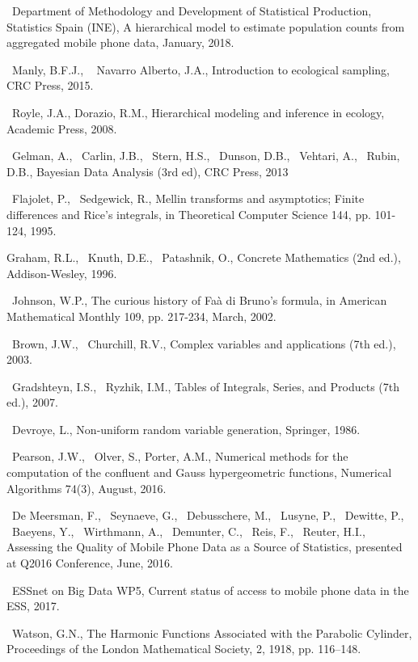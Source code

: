 \documentclass[12pt, a4paper]{article}
\begin{document}
\begin{thebibliography}{99}

~Department of Methodology and Development of Statistical Production, Statistics Spain (INE), 
A hierarchical model to estimate population counts from
aggregated mobile phone data, January, 2018.

~Manly, B.F.J., ~ Navarro Alberto, J.A., Introduction to ecological sampling,
CRC Press, 2015.

~Royle, J.A., Dorazio, R.M., Hierarchical modeling and inference in ecology,
Academic Press, 2008.

~Gelman, A., ~Carlin, J.B., ~Stern, H.S., ~Dunson, D.B., ~Vehtari, A., ~Rubin, D.B., Bayesian Data Analysis (3rd ed), CRC Press, 2013

~Flajolet, P., ~Sedgewick, R.,  Mellin transforms and asymptotics; Finite differences and Rice's integrals,
in  Theoretical Computer Science 144, pp. 101-124, 1995.

Graham, R.L., ~Knuth, D.E., ~Patashnik, O., Concrete Mathematics (2nd ed.), 
Addison-Wesley, 1996.

~Johnson, W.P., The curious history of Faà di Bruno's formula, in 
American Mathematical Monthly 109, pp. 217-234, March, 2002.

~Brown, J.W., ~Churchill, R.V., Complex variables and applications (7th ed.), 2003.

~Gradshteyn, I.S., ~Ryzhik, I.M., Tables of Integrals, Series, and Products (7th ed.),
2007.

~Devroye, L., Non-uniform random variable generation, Springer, 1986.

~Pearson, J.W., ~Olver, S., Porter, A.M., Numerical methods for the computation of the confluent and Gauss 
hypergeometric functions, Numerical Algorithms 74(3), August, 2016.

~De Meersman, F., ~Seynaeve, G., ~Debusschere, M., ~Lusyne, P., ~Dewitte, P., 
~Baeyens, Y., ~Wirthmann, A., ~Demunter, C., ~Reis, F., ~Reuter, H.I.,
Assessing the Quality of Mobile Phone Data as a Source of Statistics,
presented at Q2016 Conference, June, 2016.

~ESSnet on Big Data WP5, Current status of access to mobile phone data in the ESS, 2017.
 
~Watson, G.N., The Harmonic Functions Associated with the Parabolic Cylinder, Proceedings
 of the London Mathematical Society, 2, 1918, pp. 116–148.
\end{thebibliography}
\end{document}
